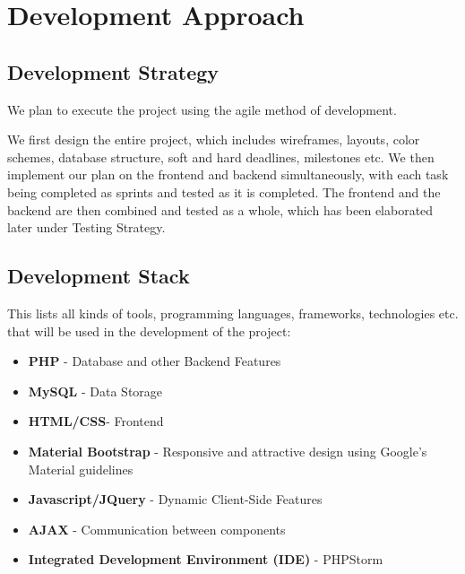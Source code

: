 \documentclass[12pt]{article}
\begin{document}
\section{Development Approach}

\subsection{Development Strategy}

We plan to execute the project using the agile method of development.

We first design the entire project, which includes wireframes, layouts, color schemes, database structure, soft and hard deadlines, milestones etc. We then implement our plan on the frontend and backend simultaneously, with each task being completed as sprints and tested as it is completed. The frontend and the backend are then combined and tested as a whole, which has been elaborated later under Testing Strategy.

\subsection{Development Stack}


This lists all kinds of tools, programming languages, frameworks, technologies etc. that will be used in the development of the project:


\begin{itemize}
    
    \item \textbf{PHP} - Database and other Backend Features

    \item \textbf{MySQL} - Data Storage
    
    \item \textbf{HTML/CSS}- Frontend
    
    \item \textbf{Material Bootstrap} - Responsive and attractive design using Google's Material guidelines
    
    \item \textbf{Javascript/JQuery} - Dynamic Client-Side Features
    
    \item \textbf{AJAX} - Communication between components
    
    \item \textbf{Integrated Development Environment (IDE)} - PHPStorm

\end{itemize}
\end{document}
